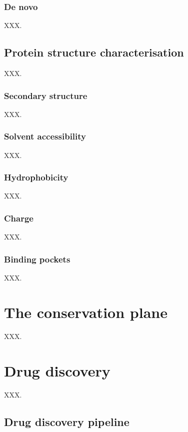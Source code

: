 \subsubsection{De novo}

XXX.

\subsection{Protein structure characterisation}

XXX.

\subsubsection{Secondary structure}

XXX.

\subsubsection{Solvent accessibility}

XXX.

\subsubsection{Hydrophobicity}

XXX.

\subsubsection{Charge}

XXX.

\subsubsection{Binding pockets}

XXX.

\section{The conservation plane}

XXX.

\section{Drug discovery}

XXX.

\subsection{Drug discovery pipeline}

